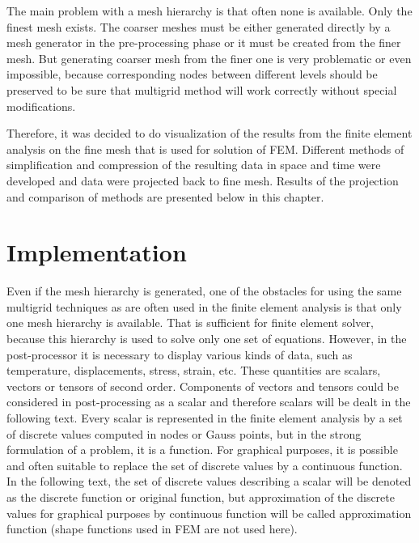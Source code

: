 The main problem with a mesh hierarchy is that often none is available. Only the finest mesh exists. The coarser meshes must be either generated directly by a mesh generator \cite{Frey2000,Rypl1998} in the pre-processing phase or it must be created from the finer mesh. But generating coarser mesh from the finer one is very problematic or even impossible, because corresponding nodes between different levels should be preserved to be sure that multigrid method will work correctly without special modifications.

Therefore, it was decided to do visualization of the results from the finite element analysis on the fine mesh that is used for solution of FEM. Different methods of simplification and compression of the resulting data in space and time were developed and data were projected back to fine mesh. Results of the projection and comparison of methods are presented below in this chapter.


\section{Implementation}

Even if the mesh hierarchy is generated, one of the obstacles for using the same multigrid techniques as are often used in the finite element analysis is that only one mesh hierarchy is available. That is sufficient for finite element solver, because this hierarchy is used to solve only one set of equations. However, in the post-processor it is necessary to display various kinds of data, such as temperature, displacements, stress, strain, etc. These quantities are scalars, vectors or tensors of second order. Components of vectors and tensors could be considered in post-processing as a scalar and therefore scalars will be dealt in the following text. Every scalar is represented in the finite element analysis by a set of discrete values computed in nodes or Gauss points, but in the strong formulation of a problem, it is a function. For graphical purposes, it is possible and often suitable to replace the set of discrete values by a continuous function. In the following text, the set of discrete values describing a scalar will be denoted as the discrete function or original function, but approximation of the discrete values for graphical purposes by continuous function will be called approximation function (shape functions used in FEM are not used here).

